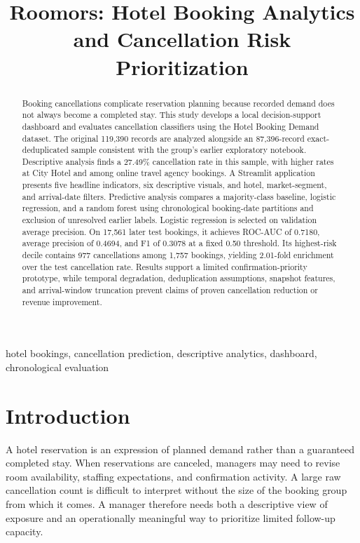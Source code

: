 \documentclass[conference]{IEEEtran}
\title{Roomors: Hotel Booking Analytics and Cancellation Risk Prioritization}
\author{\IEEEauthorblockN{Job Russel Enriquez and John Cyruz Patron}\IEEEauthorblockA{BSIT--401I, Group 4.2\\Foundations of Business Analytics\\Jose Rizal University}}
\begin{document}
\maketitle
\begin{abstract}
Booking cancellations complicate reservation planning because recorded demand does not always become a completed stay. This study develops a local decision-support dashboard and evaluates cancellation classifiers using the Hotel Booking Demand dataset. The original 119,390 records are analyzed alongside an 87,396-record exact-deduplicated sample consistent with the group's earlier exploratory notebook. Descriptive analysis finds a 27.49\% cancellation rate in this sample, with higher rates at City Hotel and among online travel agency bookings. A Streamlit application presents five headline indicators, six descriptive visuals, and hotel, market-segment, and arrival-date filters. Predictive analysis compares a majority-class baseline, logistic regression, and a random forest using chronological booking-date partitions and exclusion of unresolved earlier labels. Logistic regression is selected on validation average precision. On 17,561 later test bookings, it achieves ROC-AUC of 0.7180, average precision of 0.4694, and F1 of 0.3078 at a fixed 0.50 threshold. Its highest-risk decile contains 977 cancellations among 1,757 bookings, yielding 2.01-fold enrichment over the test cancellation rate. Results support a limited confirmation-priority prototype, while temporal degradation, deduplication assumptions, snapshot features, and arrival-window truncation prevent claims of proven cancellation reduction or revenue improvement.
\end{abstract}
\begin{IEEEkeywords}
hotel bookings, cancellation prediction, descriptive analytics, dashboard, chronological evaluation
\end{IEEEkeywords}

\section{Introduction}
A hotel reservation is an expression of planned demand rather than a guaranteed completed stay. When reservations are canceled, managers may need to revise room availability, staffing expectations, and confirmation activity. A large raw cancellation count is difficult to interpret without the size of the booking group from which it comes. A manager therefore needs both a descriptive view of exposure and an operationally meaningful way to prioritize limited follow-up capacity.
\end{document}
